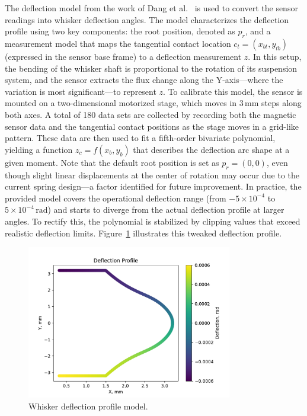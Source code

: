 The deflection model from the work of Dang et al.~\cite{dang2025whisker} is used to convert the sensor readings into whisker deflection angles.
The model characterizes the deflection profile using two key components: the root position, denoted as \(p_r\), and a measurement model that maps the tangential contact location \(c_t = (x_{bt}, y_{tb})\) (expressed in the sensor base frame) to a deflection measurement \(z\).
In this setup, the bending of the whisker shaft is proportional to the rotation of its suspension system, and the sensor extracts the flux change along the Y-axis—where the variation is most significant—to represent \(z\).
To calibrate this model, the sensor is mounted on a two-dimensional motorized stage, which moves in 3\,mm steps along both axes.
A total of 180 data sets are collected by recording both the magnetic sensor data and the tangential contact positions as the stage moves in a grid-like pattern.
These data are then used to fit a fifth-order bivariate polynomial, yielding a function \(z_c = f(x_b, y_b)\) that describes the deflection arc shape at a given moment.
Note that the default root position is set as \(p_r = (0,0)\), even though slight linear displacements at the center of rotation may occur due to the current spring design—a factor identified for future improvement.
In practice, the provided model covers the operational deflection range (from \(-5\times10^{-4}\) to \(5\times10^{-4}\,\text{rad}\)) and starts to diverge from the actual deflection profile at larger angles.
To rectify this, the polynomial is stabilized by clipping values that exceed realistic deflection limits.
Figure~\ref{fig:deflection_profile} illustrates this tweaked deflection profile.

\begin{figure}[htb]
    \centering
    \includegraphics[width=0.8\textwidth]{figures/deflection_profile}
    \caption{Whisker deflection profile model.}
    \label{fig:deflection_profile}
\end{figure}
